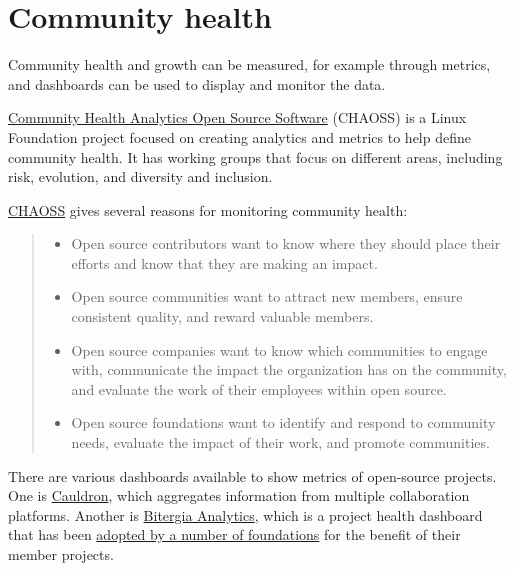 


\chapter{Community health}

Community health and growth can be measured, for example through metrics, and dashboards can be used to display and monitor the data.

\href{https://chaoss.community/}{Community Health Analytics Open Source Software} (CHAOSS) is a Linux Foundation project focused on creating analytics and metrics to help define community health.  It has working groups that focus on different areas, including risk, evolution, and diversity and inclusion.

\begin{kaobox}[frametitle=CHAOSS: the importance of community health]

\href{https://chaoss.community/about/}{CHAOSS} gives several reasons for monitoring community health:

\begin{quote}

\begin{itemize}

\itemsep 0.5em

\item Open source contributors want to know where they should place their efforts and know that they are making an impact.
\item Open source communities want to attract new members, ensure consistent quality, and reward valuable members.
\item Open source companies want to know which communities to engage with, communicate the impact the organization has on the community, and evaluate the work of their employees within open source.
\item Open source foundations want to identify and respond to community needs, evaluate the impact of their work, and promote communities.

\end{itemize}

\end{quote}

\end{kaobox}

There are various dashboards available to show metrics of open-source projects.  One is \href{https://cauldron.io/}{Cauldron}, which aggregates information from multiple collaboration platforms.  Another is \href{https://bitergia.com/bitergia-analytics/}{Bitergia Analytics}, which is a project health dashboard that has been \href{https://bitergia.com/oss-foundations/}{adopted by a number of foundations} for the benefit of their member projects.

